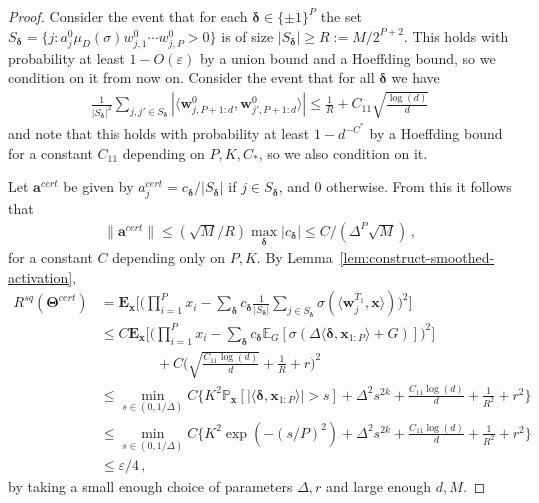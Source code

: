 \documentclass[11pt]{article}
\renewcommand{\P}{\mathbb{P}}
\newcommand{\E}{\mathbb{E}}
\newcommand{\eps}{\varepsilon}
\newcommand{\<}{\langle}
\renewcommand{\>}{\rangle}
\theoremstyle{definition}
\def\ba{{\boldsymbol a}}
\def\bw{{\boldsymbol w}}
\def\bx{{\boldsymbol x}}
\def\bdelta{{\boldsymbol\delta}}
\def\bTheta{{\boldsymbol \Theta}}
\def\bdelta{{\boldsymbol\delta}}
\def\bTheta{{\boldsymbol \Theta}}
\def\bw{{\boldsymbol w}}
\def\bx{{\boldsymbol x}}
\def\ba{{\boldsymbol a}}
\def\bTheta{{\boldsymbol \Theta}}
\def\eps{\varepsilon}
\def\oT{\overline{T}}
\begin{document}
\begin{proof}
Consider the event that for each $\bdelta \in \{\pm 1\}^P$ the set $S_{\bdelta} = \{j : a_j^0 \mu_D(\sigma) w_{j,1}^0 \cdots w_{j,P}^0 > 0\}$ is of size $|S_{\bdelta}| \geq R := M / 2^{P+2}$. This holds with probability at least $1 - O(\eps)$ by a union bound and a Hoeffding bound, so we condition on it from now on. Consider the event that for all $\bdelta$ we have
\begin{align*}
\frac{1}{|S_{\bdelta}|^2} \sum_{j,j' \in S_{\bdelta}} |\<\bw_{j,P+1:d}^0, \bw_{j',P+1:d}^0\>| \leq \frac{1}{R} + C_{11}\sqrt{\frac{\log(d)}{d}}
\end{align*}
and note that this holds with probability at least $1 - d^{-C^*}$ by a Hoeffding bound for a constant $C_{11}$ depending on $P,K,C_*$, so we also condition on it.

Let $\ba^{cert}$ be given by $a^{cert}_j = c_{\bdelta} / |S_{\bdelta}|$ if  $j \in S_{\bdelta}$, and  0 otherwise. From this it follows that
\begin{align*}
\|\ba^{cert}\| \leq (\sqrt{M} /R) \max_{\bdelta} |c_{\bdelta}| \leq C / (\Delta^P \sqrt{M})\,,
\end{align*}
for a constant $C$ depending only on $P,K$. By Lemma~\ref{lem:construct-smoothed-activation},
\begin{align*}
R^{sq}(\bTheta^{cert}) &= 
\mathbf{E}_{\bx}\Big[\Big(\prod_{i=1}^P x_i - \sum_{\bdelta} c_{\bdelta} \frac{1}{|S_{\bdelta}|} \sum_{j \in S_{\bdelta}} \sigma(\<\bw_j^{\oT_1},\bx\>)\Big)^2\Big] \\
&\leq C \mathbf{E}_{\bx}\Big[\Big(\prod_{i=1}^P x_i - \sum_{\bdelta} c_{\bdelta} \E_{G}[\sigma(\Delta \<\bdelta,\bx_{1:P}\> + G)]\Big)^2\Big]\\
&\qquad \qquad+ C \Big(\sqrt{\frac{C_{11}\log(d)}{d}} + \frac{1}{R} + r\Big)^2 \\
&\leq \min_{s \in (0,1/\Delta)} C\Big\{ K^2 \P_{\bx}[|\<\bdelta,\bx_{1:P}\>| > s] + \Delta^2 s^{2k} + \frac{C_{11}\log(d)}{d} + \frac{1}{R^2} + r^2 \Big\} \\
&\leq \min_{s \in (0,1/\Delta)} C \Big\{ K^2 \exp(-(s/P)^2) + \Delta^2 s^{2k} + \frac{C_{11}\log(d)}{d} + \frac{1}{R^2} + r^2 \Big\} \\
&\leq \eps / 4\,,
\end{align*}
by taking a small enough choice of parameters $\Delta, r$ and large enough $d, M$.
\end{proof}
\end{document}
